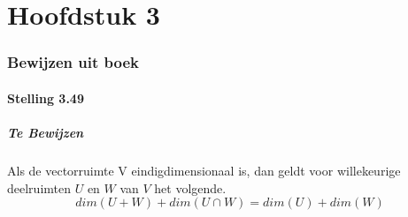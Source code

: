 \documentclass[lineaire_algebra_oplossingen.tex]{subfiles}
\begin{document}
\part{Hoofdstuk 3}

\section{Bewijzen uit boek}
\subsection{Stelling 3.49}
\subsubsection*{Te Bewijzen}
Als de vectorruimte V eindigdimensionaal is, dan geldt voor willekeurige deelruimten $U$ en $W$ van $V$ het volgende.
\[
dim(U+W) + dim(U\cap W) = dim(U) + dim(W)
\]
\end{document}

